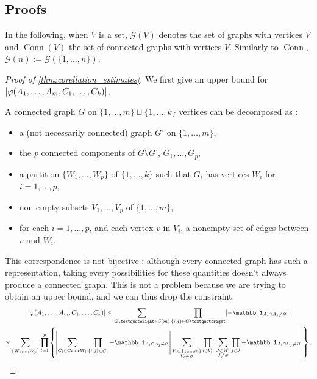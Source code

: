 \documentclass{article}
\DeclarePairedDelimiter\abs{\lvert}{\rvert}
\DeclareMathOperator{\Conn}{Conn}
\begin{document}
\subsection{Proofs}
In the following, when $V$ is a set, $\mathcal G(V)$ denotes the set of graphs with vertices $V$ and $\Conn(V)$ the set of connected graphs with vertices $V$.
Similarly to $\Conn$, $\mathcal{G}(n):=\mathcal G(\{1,\ldots,n\})$.
\begin{proof}[Proof of \cref{thm:corellation_estimates}]
    We first give an upper bound for $\abs{\varphi(A_1,\ldots,A_m,C_1,\ldots,C_k)}$.
    
    A connected graph $G$ on $\{1,\ldots,m\}\sqcup \{1,\ldots,k\}$ vertices can be decomposed as :\begin{itemize}
        \item a (not necessarily connected) graph $G’$ on $\{1,\ldots,m\}$,
        \item the $p$ connected components of $G\setminus G’$, $G_1,\ldots, G_p$,
        \item a partition $\{W_1,\ldots,W_p\}$ of $\{1,\ldots,k\}$ such that $G_i$ has vertices $W_i$ for $i=1,\ldots,p$,
        \item non-empty subsets $V_1,\ldots,V_p$ of $\{1,\ldots,m\}$,
        \item for each $i=1,\ldots,p$, and each vertex $v$ in $V_i$, a nonempty set of edges between $v$ and $W_i$.
        \end{itemize}
        This correspondence is not bijective : although every connected graph has such a representation, taking every possibilities for these quantities doesn’t always produce a connected graph.
        This is not a problem because we are trying to obtain an upper bound, and we can thus drop the constraint:
        \begin{multline*}
            \abs{\varphi(A_1,\ldots,A_m,C_1,\ldots,C_k)}\leq\sum_{G’\in \mathcal G(m)}\prod_{\{i,j\}\in G’}\abs{-\mathbb 1_{A_i\cap A_j\neq\varnothing}}\\
            \times \sum_{\{W_1,\ldots,W_p\}}\prod_{l=1}^p \left\{ \left| \sum_{G_l\in \Conn{W_l}}\prod_{\{i,j\}\in G_l}-\mathbb 1_{A_i\cap A_j\neq\varnothing}\right| 
            \sum_{\substack{V_l\subset \{1,\ldots,m\}\\V_l\neq\varnothing}}\prod_{i\in V_l}\left|\sum_{\substack{J\subset W_l\\J\neq\varnothing}} \prod_{j\in J}-\mathbb 1_{A_i\cap C_j\neq\varnothing}\right|\right\}.

\end{multline*}
\end{proof}
\end{document}
